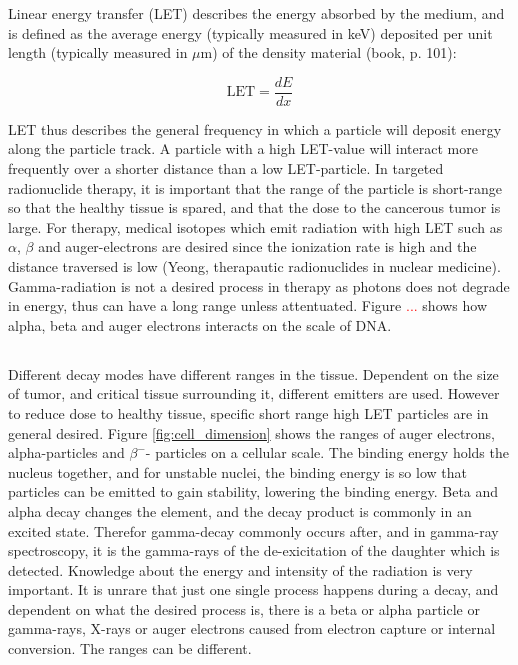 \documentclass[a4paper,11pt,twoside]{book}
\begin{document}
\noindent 
Linear energy transfer (LET) describes the energy absorbed by the medium, and is defined as the  average energy (typically measured in keV) deposited per unit length (typically measured in $\mu$m) of the density material (book, p. 101):

\begin{equation}
    \text{LET} = \frac{dE}{dx}
\end{equation}

\noindent 
LET thus describes the general frequency in which a particle will deposit energy along the particle track. A particle with a high LET-value will interact more frequently over a shorter distance than a low LET-particle. In targeted radionuclide therapy, it is important that the range of the particle is short-range so that the healthy tissue is spared, and that the dose to the cancerous tumor is large. For therapy, medical isotopes which emit radiation with high LET such as $\alpha$, $\beta$ and auger-electrons are desired since the ionization rate is high and the distance traversed is low (Yeong, therapautic radionuclides in nuclear medicine). Gamma-radiation is not a desired process in therapy as photons does not degrade in energy, thus can have a long range unless attentuated. 
Figure \textcolor{red}{...} shows how alpha, beta and auger electrons interacts on the scale of DNA. \\


\subsection*{}

Different decay modes have different ranges in the tissue. Dependent on the size of tumor, and critical tissue surrounding it, different emitters are used. However to reduce dose to healthy tissue, specific short range high LET particles are in general desired. Figure \ref{fig:cell_dimension} shows the ranges of auger electrons, alpha-particles and $\beta^-$- particles on a cellular scale. The binding energy holds the nucleus together, and for unstable nuclei, the binding energy is so low that particles can be emitted to gain stability, lowering the binding energy. Beta and alpha decay changes the element, and the decay product is commonly in an excited state. Therefor gamma-decay commonly occurs after, and in gamma-ray spectroscopy, it is the gamma-rays of the de-exicitation of the daughter which is detected. Knowledge about the energy and intensity of the radiation is very important. It is unrare that just one single process happens during a decay, and dependent on what the desired process is, there is a beta or alpha particle or gamma-rays, X-rays or auger electrons caused from electron capture or internal conversion. The ranges can be different. \\ 
\end{document}
